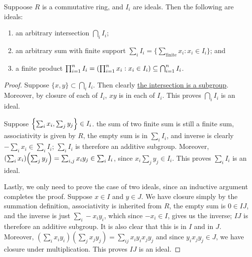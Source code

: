 \begin{proposition}\label{prop:ideal-operations}
    Suppoose \(R\) is a commutative ring,
    and \(I_i\) are ideals.
    Then the following are ideals:
    \begin{enumerate}[label={(\alph*)}, itemsep=0mm]
        \item an arbitrary intersection \(\bigcap_i I_i\);
        \item an arbitrary sum with finite support \(\sum_i I_i = \{\sum_\text{finite} x_i : x_i \in I_i\}\); and
        \item a finite product \(\prod_{i=1}^n I_i = \pqty{\prod_{i=1}^n x_i : x_i \in I_i} \subseteq \bigcap_{i=1}^n I_i\).
    \end{enumerate}
\end{proposition}
\begin{proof}
    Suppose \(\{x,y\} \subset \bigcap_i I_i\). Then clearly
    \hyperref[lem:intersection-subgroup]{the intersection is a subgroup}.
    Moreover, by closure of each of \(I_i\),
    \(xy\) is in each of \(I_i\).
    This proves \(\bigcap_i I_i\) is an ideal.

    Suppose \(\Bqty{\sum_i x_i, \sum_j y_j} \in I_i\).
    the sum of two finite sum is still a finite sum,
    associativity is given by \(R\),
    the empty sum is in \(\sum_i I_i\),
    and inverse is clearly \(-\sum_i x_i \in \sum_i I_i\);
    \(\sum_i I_i\) is therefore an additive subgroup.
    Moreover, \(\pqty{\sum_i x_i}\pqty{\sum_j y_j} = \sum_{i,j} x_i y_j \in \sum_i I_i\),
    since \(x_i \sum_j y_j \in I_i\).
    This proves \(\sum_i I_i\) is an ideal.

    Lastly, we only need to prove the case of two ideals,
    since an inductive argument completes the proof.
    Suppose \(x \in I\) and \(y \in J\).
    We have closure simply by the summation definition,
    associativity is inherited from \(R\),
    the empty sum is \(0 \in IJ\),
    and the inverse is just \(\sum_i -x_i y_i\),
    which since \(-x_i \in I\), gives us the inverse;
    \(IJ\) is therefore an additive subgroup.
    It is also clear that this is in \(I\) and in \(J\).
    Moreover, \((\sum_i x_i y_i)(\sum_j x_j y_j)
    = \sum_{ij} x_i y_i x_j y_j\)
    and since \(y_i x_j y_j \in J\),
    we have closure under multiplication.
    This proves \(IJ\) is an ideal.
\end{proof}
